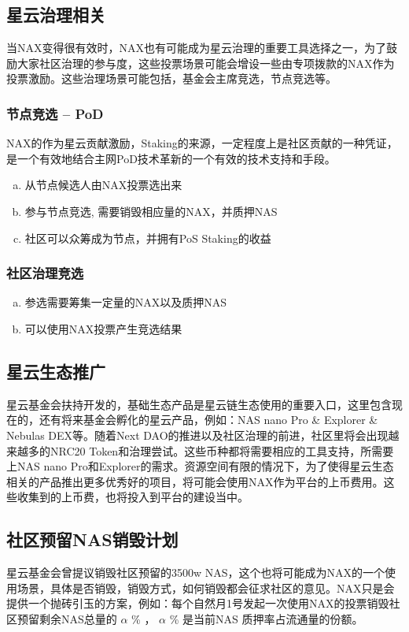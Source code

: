 \subsection{星云治理相关}
当NAX变得很有效时，NAX也有可能成为星云治理的重要工具选择之一，为了鼓励大家社区治理的参与度，这些投票场景可能会增设一些由专项拨款的NAX作为投票激励。这些治理场景可能包括，基金会主席竞选，节点竞选等。

\subsubsection{节点竞选 -- PoD}
NAX的作为星云贡献激励，Staking的来源，一定程度上是社区贡献的一种凭证，是一个有效地结合主网PoD技术革新的一个有效的技术支持和手段。

\begin{enumerate}[a.]
  \item 从节点候选人由NAX投票选出来
  \item 参与节点竞选, 需要销毁相应量的NAX，并质押NAS
  \item 社区可以众筹成为节点，并拥有PoS Staking的收益
\end{enumerate}

\subsubsection{社区治理竞选}
\begin{enumerate}[a.]
  \item 参选需要筹集一定量的NAX以及质押NAS
  \item 可以使用NAX投票产生竞选结果
\end{enumerate}

\subsection{星云生态推广}
星云基金会扶持开发的，基础生态产品是星云链生态使用的重要入口，这里包含现在的，还有将来基金会孵化的星云产品，例如：NAS nano Pro \& Explorer \& Nebulas DEX等。随着Next DAO的推进以及社区治理的前进，社区里将会出现越来越多的NRC20 Token和治理尝试。这些币种都将需要相应的工具支持，所需要上NAS nano Pro和Explorer的需求。资源空间有限的情况下，为了使得星云生态相关的产品推出更多优秀好的项目，将可能会使用NAX作为平台的上币费用。这些收集到的上币费，也将投入到平台的建设当中。

\subsection{社区预留NAS销毁计划}
星云基金会曾提议销毁社区预留的3500w NAS，这个也将可能成为NAX的一个使用场景，具体是否销毁，销毁方式，如何销毁都会征求社区的意见。NAX只是会提供一个抛砖引玉的方案，例如：每个自然月1号发起一次使用NAX的投票销毁社区预留剩余NAS总量的 \(\alpha\) \% ， \(\alpha\) \% 是当前NAS 质押率占流通量的份额。

